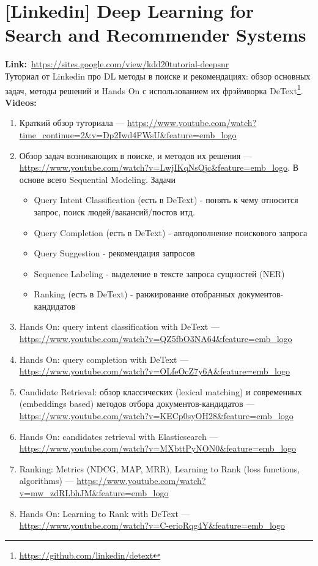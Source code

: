 
\section*{[Linkedin] Deep Learning for Search and Recommender Systems} 

\textbf{Link:}~\url{https://sites.google.com/view/kdd20tutorial-deepsnr} \\

Туториал от Linkedin про DL методы в поиске и рекомендациях: обзор основных задач, методы решений и Hands On с использованием их фрэймворка DeText\footnote{\url{https://github.com/linkedin/detext}}. \\

\textbf{Videos:}

\begin{enumerate}
    \item Краткий обзор туториала --- \url{https://www.youtube.com/watch?time_continue=2&v=Dp2Iwd4FWsU&feature=emb_logo}
    \item Обзор задач возникающих в поиске, и методов их решения --- \url{https://www.youtube.com/watch?v=LwjIKqNsQjc&feature=emb_logo}. В основе всего Sequential Modeling. 
    Задачи
        \begin{itemize}
            \item Query Intent Classification (есть в DeText) - понять к чему относится запрос, поиск людей/вакансий/постов итд.
            \item Query Completion (есть в DeText) - автодополнение поискового запроса
            \item Query Suggestion - рекомендация запросов
            \item Sequence Labeling - выделение в тексте запроса сущностей (NER)
            \item Ranking (есть в DeText) - ранжирование отобранных документов-кандидатов
        \end{itemize}
    \item Hands On: query intent classification with DeText --- \url{https://www.youtube.com/watch?v=QZ5fbO3NA64&feature=emb_logo}
    \item Hands On: query completion with DeText --- \url{https://www.youtube.com/watch?v=OLfeOcZ7y6A&feature=emb_logo}
    \item Candidate Retrieval: обзор классических (lexical matching) и современных (embeddings based) методов отбора документов-кандидатов --- \url{https://www.youtube.com/watch?v=KECp0syOH28&feature=emb_logo}
    \item Hands On: candidates retrieval with Elasticsearch --- \url{https://www.youtube.com/watch?v=MXbttPyNON0&feature=emb_logo}
    \item Ranking: Metrics (NDCG, MAP, MRR), Learning to Rank (loss functions, algorithms) --- \url{https://www.youtube.com/watch?v=mw_zdRLbhJM&feature=emb_logo}
    \item Hands On: Learning to Rank with DeText --- \url{https://www.youtube.com/watch?v=C-erioRqg4Y&feature=emb_logo}
\end{enumerate}

